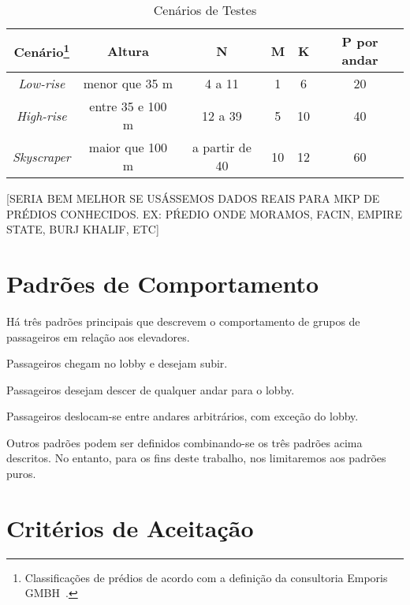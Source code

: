 \begin{savenotes}
\begin{table}[htb!]
\centering
\caption{Cenários de Testes}
\label{tab:cenarios}
\begin{tabular}{|c|c|c|c|c|c|}
\hline
{\bf Cenário\footnote{Classificações de prédios de acordo com a definição da consultoria Emporis GMBH~\cite{Emporis15}.}}    & {\bf Altura} & {\bf N}  & {\bf M}        & {\bf K} & {\bf P por andar} \\ \hline
{\it Low-rise}   & menor que 35 m          & 4 a 11         & 1       & 6       & 20      \\ \hline
{\it High-rise}  & entre 35 e 100 m        & 12 a 39        & 5       & 10      & 40      \\ \hline
{\it Skyscraper} & maior que 100 m         & a partir de 40 & 10      & 12      & 60      \\ \hline
\end{tabular}
\end{table}
\end{savenotes}

{\color{red}[SERIA BEM MELHOR SE USÁSSEMOS DADOS REAIS PARA MKP DE PRÉDIOS CONHECIDOS. EX: PŔEDIO ONDE MORAMOS, FACIN, EMPIRE STATE, BURJ KHALIF, ETC]} %

\section{Padrões de Comportamento}

Há três padrões principais que descrevem o comportamento de grupos de
passageiros em relação aos elevadores.

\begin{description}[leftmargin=!,labelwidth=\widthof{\bfseries interfloor}]
  \item[up peak]    Passageiros chegam no lobby e desejam subir.
  \item[down peak]  Passageiros desejam descer de qualquer andar para o lobby.
  \item[interfloor] Passageiros deslocam-se entre andares arbitrários, com exceção do lobby.
\end{description}

Outros padrões podem ser definidos combinando-se os três padrões acima
descritos. No entanto, para os fins deste trabalho, nos limitaremos aos padrões puros.

\section{Critérios de Aceitação}

